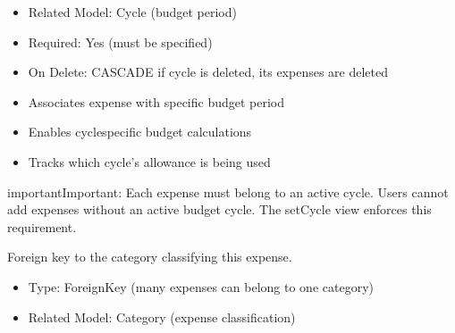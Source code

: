 \documentclass[letterpaper,10pt,english]{sphinxmanual}
\begin{document}
\begin{fulllineitems}
\begin{fulllineitems}
\begin{description}
\begin{itemize}
\item {} 
\sphinxAtStartPar
Related Model: Cycle (budget period)

\item {} 
\sphinxAtStartPar
Required: Yes (must be specified)

\item {} 
\sphinxAtStartPar
On Delete: CASCADE \sphinxhyphen{} if cycle is deleted, its expenses are deleted

\end{itemize}

\begin{itemize}
\item {} 
\sphinxAtStartPar
Associates expense with specific budget period

\item {} 
\sphinxAtStartPar
Enables cycle\sphinxhyphen{}specific budget calculations

\item {} 
\sphinxAtStartPar
Tracks which cycle’s allowance is being used

\end{itemize}

\end{description}

\begin{sphinxadmonition}{important}{Important:}
\sphinxAtStartPar
Each expense must belong to an active cycle.
Users cannot add expenses without an active budget cycle.
The setCycle view enforces this requirement.
\end{sphinxadmonition}

\end{fulllineitems}


\begin{fulllineitems}
\label{\detokenize{expensesApp:id15}}
\pysigstartsignatures
\pysigline
{}
\pysigstopsignatures
\sphinxAtStartPar
Foreign key to the category classifying this expense.
\begin{description}
\begin{itemize}
\item {} 
\sphinxAtStartPar
Type: ForeignKey (many expenses can belong to one category)

\item {} 
\sphinxAtStartPar
Related Model: Category (expense classification)


\end{itemize}
\end{description}
\end{fulllineitems}
\end{fulllineitems}
\end{document}
